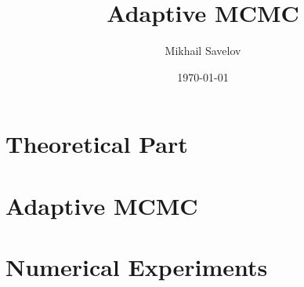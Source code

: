 \documentclass{report}
\title{Adaptive MCMC}
\author{Mikhail Savelov}
\date{\today}
\theoremstyle{plain}
\begin{document}
\maketitle

\tableofcontents

\chapter{Theoretical Part}


\chapter{Adaptive MCMC}


\chapter{Numerical Experiments}


\newpage
\printbibliography
\end{document}
